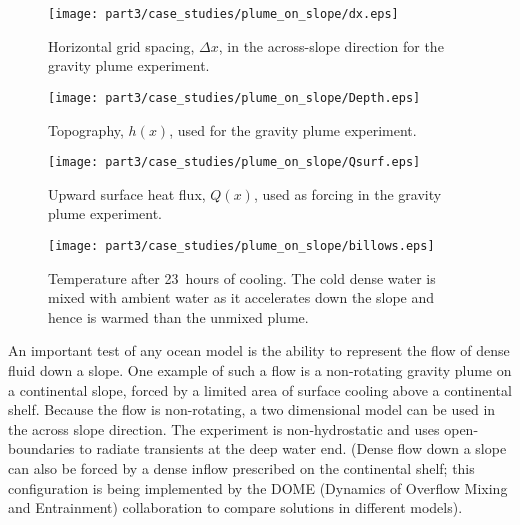 \begin{figure}
\begin{center}
\texttt{[image: part3/case\_studies/plume\_on\_slope/dx.eps]}
\end{center}
\caption{Horizontal grid spacing, $\Delta x$, in the across-slope
direction for the gravity plume experiment.}
\label{fig:dx-plume-on-slope}
\end{figure}

\begin{figure}
\begin{center}
\texttt{[image: part3/case\_studies/plume\_on\_slope/Depth.eps]}
\end{center}
\caption{Topography, $h(x)$, used for the gravity plume experiment.}
\label{fig:depth-plume-on-slope}
\end{figure}

\begin{figure}
\begin{center}
\texttt{[image: part3/case\_studies/plume\_on\_slope/Qsurf.eps]}
\end{center}
\caption{Upward surface heat flux, $Q(x)$, used as forcing in the
gravity plume experiment.}
\label{fig:Q-plume-on-slope}
\end{figure}

\begin{figure}
\begin{center}
\texttt{[image: part3/case\_studies/plume\_on\_slope/billows.eps]}
\end{center}
\caption{Temperature after 23~hours of cooling. The cold dense water is
mixed with ambient water as it accelerates down the slope and hence
is warmed than the unmixed plume.
}
\label{fig:T-plume-on-slope}
\end{figure}

An important test of any ocean model is the ability to represent the
flow of dense fluid down a slope. One example of such a flow is a
non-rotating gravity plume on a continental slope, forced by a limited
area of surface cooling above a continental shelf. Because the flow is
non-rotating, a two dimensional model can be used in the across slope
direction. The experiment is non-hydrostatic and uses open-boundaries
to radiate transients at the deep water end.  (Dense flow down a slope
can also be forced by a dense inflow prescribed on the continental
shelf; this configuration is being implemented by the DOME (Dynamics
of Overflow Mixing and Entrainment) collaboration to compare solutions
in different models).

